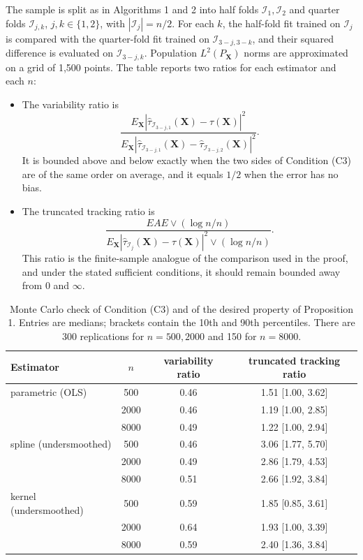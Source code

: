 \documentclass[11pt]{article}
\theoremstyle{referenceplain}
\theoremstyle{referencedefinition}
\theoremstyle{referenceremark}
\begin{document}
The sample is split as in Algorithms 1 and 2 into half folds $\mathcal I_1,\mathcal I_2$ and quarter folds $\mathcal I_{j,k}$, $j,k\in\{1,2\}$, with $|\mathcal I_j|=n/2$. For each $k$, the half-fold fit trained on $\mathcal I_j$ is compared with the quarter-fold fit trained on $\mathcal I_{3-j,3-k}$, and their squared difference is evaluated on $\mathcal I_{3-j,k}$. Population $L^2(P_{\mathbf X})$ norms are approximated on a grid of 1{,}500 points. The table reports two ratios for each estimator and each $n$:
\begin{itemize}
\item The variability ratio is
\[
\frac{E_{\mathbf X}|\widehat\tau_{\mathcal I_{3-j,1}}(\mathbf X)-\tau(\mathbf X)|^2}
{E_{\mathbf X}|\widehat\tau_{\mathcal I_{3-j,1}}(\mathbf X)-\widehat\tau_{\mathcal I_{3-j,2}}(\mathbf X)|^2}.
\]
It is bounded above and below exactly when the two sides of Condition (C3) are of the same order on average, and it equals $1/2$ when the error has no bias.
\item The truncated tracking ratio is
\[
\frac{EAE\vee(\log n/n)}{E_{\mathbf X}|\widehat\tau_{\mathcal I_j}(\mathbf X)-\tau(\mathbf X)|^2\vee(\log n/n)}.
\]
This ratio is the finite-sample analogue of the comparison used in the proof, and under the stated sufficient conditions, it should remain bounded away from $0$ and $\infty$.
\end{itemize}
\begin{table}[H]
\centering
\small
\begin{tabular}{lccc}
\hline
Estimator & $n$ & variability ratio & truncated tracking ratio \\
\hline
parametric (OLS) & 500  & 0.46 & 1.51 [1.00, 3.62] \\
                 & 2000 & 0.46 & 1.19 [1.00, 2.85] \\
                 & 8000 & 0.49 & 1.22 [1.00, 2.94] \\
spline (undersmoothed) & 500  & 0.46 & 3.06 [1.77, 5.70] \\
                       & 2000 & 0.49 & 2.86 [1.79, 4.53] \\
                       & 8000 & 0.51 & 2.66 [1.92, 3.84] \\
kernel (undersmoothed) & 500  & 0.59 & 1.85 [0.85, 3.61] \\
                       & 2000 & 0.64 & 1.93 [1.00, 3.39] \\
                       & 8000 & 0.59 & 2.40 [1.36, 3.84] \\
\hline
\end{tabular}
\caption{Monte Carlo check of Condition (C3) and of the desired property of Proposition 1. Entries are medians; brackets contain the 10th and 90th percentiles. There are 300 replications for $n=500,2000$ and 150 for $n=8000$.}
\label{tab:numeric-c1-c3}
\end{table}
\end{document}
